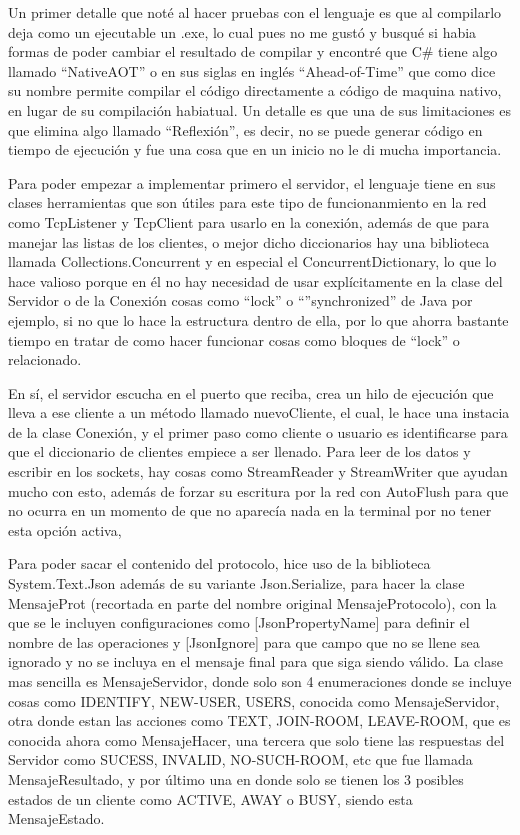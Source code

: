 \documentclass[12pt,letterpaper]{article}
\begin{document}
Un primer detalle que noté al hacer pruebas con el lenguaje es que al compilarlo deja como un ejecutable un .exe, lo cual pues no me gustó y busqué si habia formas de poder cambiar el resultado de compilar y encontré que C\# tiene algo llamado ``NativeAOT'' o en sus siglas en inglés ``Ahead-of-Time'' que como dice su nombre permite compilar el código directamente a código de maquina nativo, en lugar de su compilación habiatual. Un detalle es que una de sus limitaciones es que elimina algo llamado ``Reflexión'', es decir, no se puede generar código en tiempo de ejecución y fue una cosa que en un inicio no le di mucha importancia.

Para poder empezar a implementar primero el servidor, el lenguaje tiene en sus clases herramientas que son útiles para este tipo de funcionanmiento en la red como TcpListener y TcpClient para usarlo en la conexión, además de que para manejar las listas de los clientes, o mejor dicho diccionarios hay una biblioteca llamada Collections.Concurrent y en especial el ConcurrentDictionary, lo que lo hace valioso porque en él no hay necesidad de usar explícitamente en la clase del Servidor o de la Conexión cosas como ``lock'' o ``''synchronized'' de Java por ejemplo, si no que lo hace la estructura dentro de ella, por lo que ahorra bastante tiempo en tratar de como hacer funcionar cosas como bloques de ``lock'' o relacionado.

En sí, el servidor escucha en el puerto que reciba, crea un hilo de ejecución que lleva a ese cliente a un método llamado nuevoCliente, el cual, le hace una instacia de la clase Conexión, y el primer paso como cliente o usuario es identificarse para que el diccionario de clientes empiece a ser llenado. Para leer de los datos y escribir en los sockets, hay cosas como StreamReader y StreamWriter que ayudan mucho con esto, además de forzar su escritura por la red con AutoFlush para que no ocurra  en un momento de que no aparecía nada en la terminal por no tener esta opción activa, 

Para poder sacar el contenido del protocolo, hice uso de la biblioteca System.Text.Json además de su variante Json.Serialize, para hacer la clase MensajeProt (recortada en parte del nombre original MensajeProtocolo), con la que se le incluyen configuraciones como [JsonPropertyName] para definir el nombre de las operaciones y [JsonIgnore] para que campo que no se llene sea ignorado y no se incluya en el mensaje final para que siga siendo válido. La clase mas sencilla es MensajeServidor, donde solo son 4 enumeraciones donde se incluye cosas como IDENTIFY, NEW-USER, USERS, conocida como MensajeServidor, otra donde estan las acciones como TEXT, JOIN-ROOM, LEAVE-ROOM, que es conocida ahora como MensajeHacer, una tercera que solo tiene las respuestas del Servidor como SUCESS, INVALID, NO-SUCH-ROOM, etc que fue llamada MensajeResultado, y por último una en donde solo se tienen los 3 posibles estados de un cliente como ACTIVE, AWAY o BUSY, siendo esta MensajeEstado.
\end{document}
